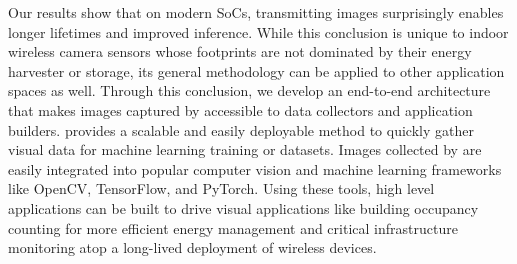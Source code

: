 Our results show that on modern SoCs, transmitting images surprisingly enables longer lifetimes and improved inference. While this conclusion is unique to indoor wireless camera sensors 
whose footprints are not dominated by their energy harvester or storage, its general methodology can be applied to other application spaces as well.
%
Through this conclusion, we develop an end-to-end architecture that makes images captured by \name accessible to data collectors and application builders. \name provides a scalable and easily deployable method to quickly gather visual data for machine learning training or datasets. Images collected by \name are easily integrated into popular computer vision and machine learning frameworks like OpenCV, TensorFlow, and PyTorch. Using these tools, high level applications can be built to drive visual applications like building occupancy counting for more efficient energy management and critical infrastructure monitoring atop a long-lived deployment of wireless \name devices.




